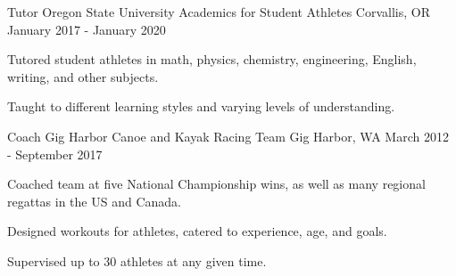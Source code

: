 \begin{cventries}
  \cventry
    {Tutor} %
    {Oregon State University Academics for Student Athletes} %
    {Corvallis, OR} %
    {January 2017 - January 2020} %
    {
      \begin{cvitems} %
        \item {Tutored student athletes in math, physics, chemistry, engineering, English, writing, and other subjects.}
        \item{Taught to different learning styles and varying levels of understanding.}
      \end{cvitems}
    }

  \cventry
    {Coach} %
    {Gig Harbor Canoe and Kayak Racing Team} %
    {Gig Harbor, WA} %
    {March 2012 - September 2017} %
    {
      \begin{cvitems} %
        \item {Coached team at five National Championship wins, as well as many regional regattas in the US and Canada.}
		\item {Designed workouts for athletes, catered to experience, age, and goals.}
		\item{Supervised up to 30 athletes at any given time.}
      \end{cvitems}
    }

  
\end{cventries}
